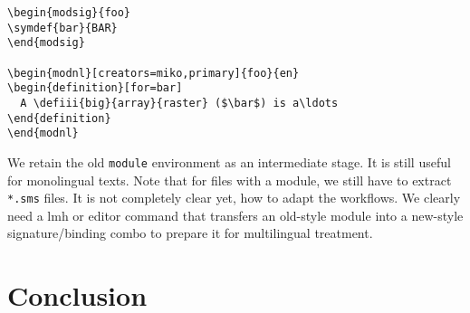 \documentclass{bluenote}
\def\lmh{\textsf{lmh}\xspace}
\begin{document}
\begin{lstlisting}[caption=New-Style \protect\sTeX,label=lst:newmods]
\begin{modsig}{foo}
\symdef{bar}{BAR}
\end{modsig}

\begin{modnl}[creators=miko,primary]{foo}{en}
\begin{definition}[for=bar]
  A \defiii{big}{array}{raster} ($\bar$) is a\ldots
\end{definition}
\end{modnl}
\end{lstlisting}
We retain the old \lstinline|module| environment as an intermediate stage. It is still
useful for monolingual texts. Note that for files with a module, we still have to extract
\lstinline|*.sms| files. It is not completely clear yet, how to adapt the workflows. We
clearly need a \lmh or editor command that transfers an old-style module into a new-style
signature/binding combo to prepare it for multilingual treatment.

\section{Conclusion}
\printbibliography
\end{document}
